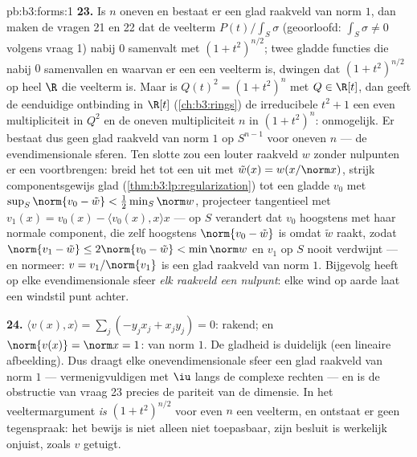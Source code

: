 \begin{solution}{pb:b3:forms:1}
\textbf{23.} Is $n$ oneven en bestaat er een glad raakveld van
norm $1$, dan maken de vragen 21 en 22 dat de veelterm
$P(t)/\int_S\sigma$ (geoorloofd: $\int_S\sigma \neq 0$ volgens
vraag 1) nabij $0$ samenvalt met $(1 + t^2)^{n/2}$; twee gladde
functies die nabij $0$ samenvallen en waarvan er een een veelterm
is, dwingen dat $(1 + t^2)^{n/2}$ op heel $\R$ die veelterm is.
Maar is $Q(t)^2 = (1 + t^2)^n$ met $Q \in \R[t]$, dan geeft de
eenduidige ontbinding in $\R[t]$
(\cref{ch:b3:rings}) de irreducibele $t^2 + 1$ een even
multipliciteit in $Q^2$ en de oneven multipliciteit $n$ in $(1 +
t^2)^n$: onmogelijk. Er bestaat dus geen glad raakveld van norm
$1$ op $S^{n-1}$ voor oneven $n$ --- de evendimensionale sferen.
Ten slotte zou een louter  raakveld $w$ zonder nulpunten
er een voortbrengen: breid het tot een  uit met $\tilde
w(x) = w(x/\norm x)$, strijk componentsgewijs glad
(\cref{thm:b3:lp:regularization}) tot een gladde $v_0$ met
$\sup_S\norm{v_0 - \tilde w} < \frac12\min_S\norm w$, projecteer
tangentieel met $v_1(x) = v_0(x) - \langle v_0(x), x\rangle x$
--- op $S$ verandert dat $v_0$ hoogstens met haar normale
component, die zelf hoogstens $\norm{v_0 - \tilde w}$ is omdat
$\tilde w$ raakt, zodat $\norm{v_1 - \tilde w} \leq 2\norm{v_0 -
\tilde w} < \min\norm w$ en $v_1$ op $S$ nooit verdwijnt --- en
normeer: $v = v_1/\norm{v_1}$ is een glad raakveld van norm $1$.
Bijgevolg heeft op elke evendimensionale sfeer \emph{elk 
raakveld een nulpunt}: elke wind op aarde laat een windstil punt
achter.

\textbf{24.} $\langle v(x), x\rangle = \sum_j(-y_jx_j + x_jy_j) =
0$: rakend; en $\norm{v(x)} = \norm x = 1$: van norm $1$. De
gladheid is duidelijk (een lineaire afbeelding). Dus draagt elke
onevendimensionale sfeer een glad raakveld van norm $1$ ---
vermenigvuldigen met $\iu$ langs de complexe rechten --- en is de
obstructie van vraag 23 precies de pariteit van de dimensie. In
het veeltermargument \emph{is} $(1 + t^2)^{n/2}$ voor even $n$
een veelterm, en ontstaat er geen tegenspraak: het bewijs is niet
alleen niet toepasbaar, zijn besluit is werkelijk onjuist, zoals
$v$ getuigt.


\end{solution}
